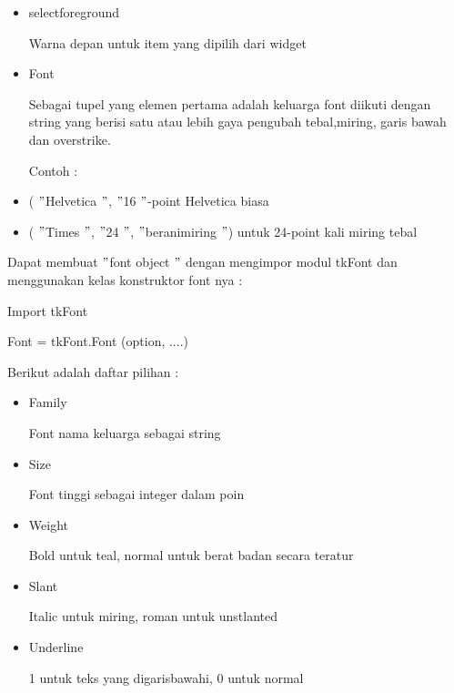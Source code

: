\documentclass{wileySix}
\begin{document}
\begin{myEnumerate}
{\begin{myEnumerate}
\begin{itemize}
		\noindent 
		\item selectforeground \par
		Warna depan untuk item yang dipilih dari widget \par
		\noindent 
		\item Font \par
		\noindent 
		Sebagai tupel yang elemen pertama adalah keluarga font diikuti dengan string yang berisi satu atau lebih gaya pengubah tebal,miring, garis bawah dan overstrike. \par
		\noindent 
		Contoh : \par
		\noindent 
		\item ( $ " $Helvetica $ " $, $ " $16 $ " $-point Helvetica biasa \par
		\noindent 
		\item ( $ " $Times $ " $, $ " $24 $ " $, $ " $beranimiring $ " $) untuk 24-point kali miring tebal\end{itemize}
	\par
	\vspace{12pt}
	Dapat membuat  $ " $font object $ " $ dengan mengimpor modul tkFont dan menggunakan kelas konstruktor font nya : \par
	Import tkFont \par
	Font = tkFont.Font (option, ....) \par
	\vspace{12pt}
	Berikut adalah daftar pilihan : \par
	\noindent 
	\begin{itemize}
		\item Family \par
		Font nama keluarga sebagai string \par
		\noindent 
		\item Size \par
		Font tinggi sebagai integer dalam poin \par
		\noindent 
		\item Weight \par
		Bold untuk teal, normal untuk berat badan secara teratur \par
		\noindent 
		\item Slant \par
		Italic untuk miring, roman untuk unstlanted \par
		\noindent 
		\item Underline \par
		1 untuk teks yang digarisbawahi, 0 untuk normal \par

\end{itemize}
\end{myEnumerate}}
\end{myEnumerate}
\end{document}
